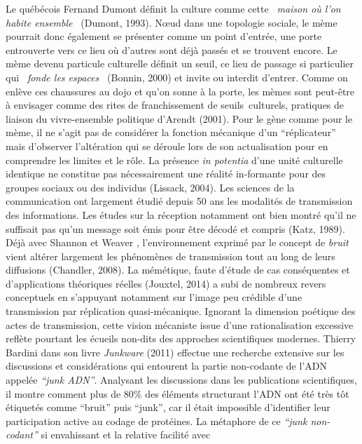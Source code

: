 Le qu\'eb\'ecois Fernand Dumont d\'efinit la culture comme cette \textit{{\guillemotleft}~maison o\`u l{\textquoteright}on habite ensemble~{\guillemotright} }(Dumont, 1993). N{\oe}ud dans une topologie sociale, le m\`eme pourrait donc \'egalement se pr\'esenter comme un point d{\textquoteright}entr\'ee, une porte entrouverte vers ce lieu o\`u d{\textquoteright}autres sont d\'ej\`a pass\'es et se trouvent encore. Le m\`eme devenu particule culturelle d\'efinit un seuil, ce lieu de passage si particulier qui \textit{{\guillemotleft}~fonde les espaces~{\guillemotright}} (Bonnin, 2000) et invite ou interdit d{\textquoteright}entrer. Comme on enl\`eve ces chaussures au dojo et qu{\textquoteright}on sonne \`a la porte, les m\`emes sont peut-\^etre \`a envisager comme des rites de franchissement de seuils~culturels, pratiques de liaison du vivre-ensemble politique d{\textquoteright}Arendt (2001). Pour le g\`ene comme pour le m\`eme, il ne s{\textquoteright}agit pas de consid\'erer la fonction m\'ecanique d{\textquoteright}un {\textquotedblleft}r\'eplicateur{\textquotedblright} mais d{\textquoteright}observer l{\textquoteright}alt\'eration qui se d\'eroule lors de son actualisation pour en comprendre les limites et le r\^ole. La pr\'esence \textit{in potentia }d{\textquoteright}une unit\'e culturelle identique ne constitue pas n\'ecessairement une r\'ealit\'e in-formante pour des groupes sociaux ou des individus (Lissack, 2004). Les sciences de la communication ont largement \'etudi\'e depuis 50 ans les modalit\'es de transmission des informations. Les \'etudes sur la r\'eception notamment ont bien montr\'e qu{\textquoteright}il ne suffisait pas qu{\textquoteright}un message soit \'emis pour \^etre d\'ecod\'e et compris (Katz, 1989). D\'ej\`a avec Shannon et Weaver \cite{Jakobson1960}, l{\textquoteright}environnement exprim\'e par le concept de\textit{ bruit }vient alt\'erer largement les ph\'enom\`enes de transmission tout au long de leurs diffusions (Chandler, 2008). La m\'em\'etique, faute d{\textquoteright}\'etude de cas cons\'equentes et d{\textquoteright}applications th\'eoriques r\'eelles (Jouxtel, 2014) a subi de nombreux revers conceptuels en s{\textquoteright}appuyant notamment sur l{\textquoteright}image peu cr\'edible d{\textquoteright}une transmission par r\'eplication quasi-m\'ecanique. Ignorant la dimension po\'etique des actes de transmission, cette vision m\'ecaniste issue d{\textquoteright}une rationalisation excessive refl\`ete pourtant les \'ecueils non-dits des approches scientifiques modernes. Thierry Bardini dans son livre \textit{Junkware }(2011) effectue une recherche extensive sur les discussions et consid\'erations qui entourent la partie non-codante de l{\textquoteright}ADN appel\'ee \textit{{\textquotedblleft}junk ADN{\textquotedblright}}. Analysant les discussions dans les publications scientifiques, il montre comment plus de 80\% des \'el\'ements structurant l{\textquoteright}ADN ont \'et\'e tr\`es t\^ot \'etiquet\'es comme {\textquotedblleft}bruit{\textquotedblright} puis {\textquotedblleft}junk{\textquotedblright}, car il \'etait impossible d{\textquoteright}identifier leur participation active au codage de prot\'eines. La m\'etaphore de ce \textit{{\textquotedblleft}junk non-codant{\textquotedblright} }si envahissant et la relative facilit\'e avec 